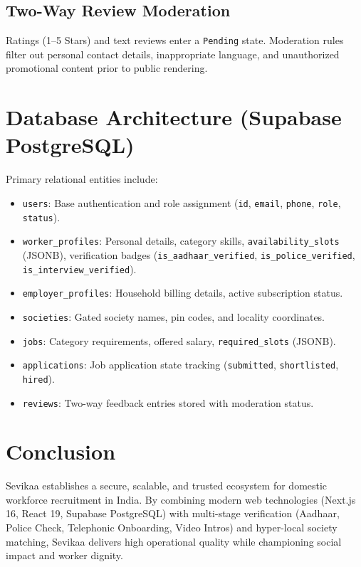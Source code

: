 \documentclass[11pt,a4paper]{article}
\begin{document}
\subsection{Two-Way Review Moderation}
Ratings (1--5 Stars) and text reviews enter a \texttt{Pending} state. Moderation rules filter out personal contact details, inappropriate language, and unauthorized promotional content prior to public rendering.

\section{Database Architecture (Supabase PostgreSQL)}

Primary relational entities include:
\begin{itemize}[noitemsep]
    \item \texttt{users}: Base authentication and role assignment (\texttt{id}, \texttt{email}, \texttt{phone}, \texttt{role}, \texttt{status}).
    \item \texttt{worker\_profiles}: Personal details, category skills, \texttt{availability\_slots} (JSONB), verification badges (\texttt{is\_aadhaar\_verified}, \texttt{is\_police\_verified}, \texttt{is\_interview\_verified}).
    \item \texttt{employer\_profiles}: Household billing details, active subscription status.
    \item \texttt{societies}: Gated society names, pin codes, and locality coordinates.
    \item \texttt{jobs}: Category requirements, offered salary, \texttt{required\_slots} (JSONB).
    \item \texttt{applications}: Job application state tracking (\texttt{submitted}, \texttt{shortlisted}, \texttt{hired}).
    \item \texttt{reviews}: Two-way feedback entries stored with moderation status.
\end{itemize}

\section{Conclusion}
Sevikaa establishes a secure, scalable, and trusted ecosystem for domestic workforce recruitment in India. By combining modern web technologies (Next.js 16, React 19, Supabase PostgreSQL) with multi-stage verification (Aadhaar, Police Check, Telephonic Onboarding, Video Intros) and hyper-local society matching, Sevikaa delivers high operational quality while championing social impact and worker dignity.
\end{document}

